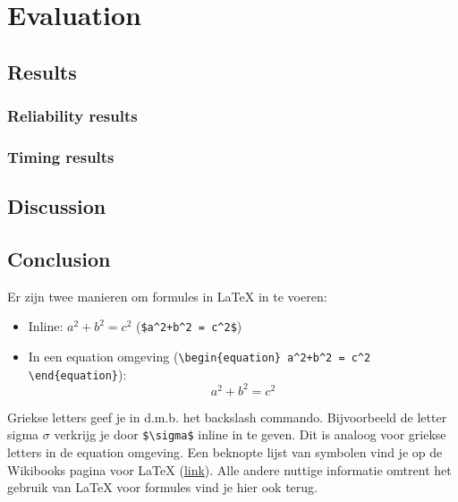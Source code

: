 \chapter{Evaluation}
\section{Results}
\subsection{Reliability results}
\subsection{Timing results}
\section{Discussion}
\section{Conclusion}
Er zijn twee manieren om formules in LaTeX in te voeren:

\begin{itemize}
	\item Inline: $a^2+b^2 = c^2$ (\verb|$a^2+b^2 = c^2$|)
	\item In een equation omgeving 	(\verb|\begin{equation}	a^2+b^2 = c^2	\end{equation}|):
	\begin{equation}
		a^2+b^2 = c^2
	\end{equation}

\end{itemize}

Griekse letters geef je in d.m.b. het backslash commando. Bijvoorbeeld de letter sigma $\sigma$ verkrijg je door \verb|$\sigma$| inline in te geven. Dit is analoog voor griekse letters in de equation omgeving. Een beknopte lijst van symbolen vind je op de Wikibooks pagina voor LaTeX (\href{https://nl.wikibooks.org/wiki/LaTeX/Wiskundige_formules}{link}). Alle andere nuttige informatie omtrent het gebruik van LaTeX voor formules vind je hier ook terug.
\cleardoublepage
